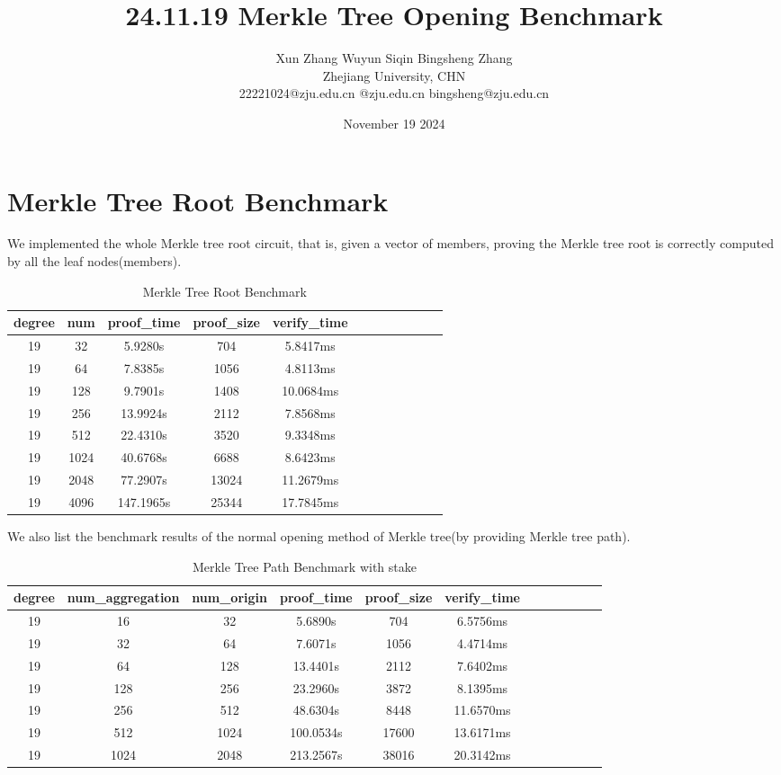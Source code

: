 \documentclass{article}
\title{24.11.19 Merkle Tree Opening Benchmark}
\author{Xun Zhang \quad \quad Wuyun Siqin \quad \quad Bingsheng Zhang \\ 
Zhejiang University, CHN \\
22221024@zju.edu.cn \quad 3210101763@zju.edu.cn \quad bingsheng@zju.edu.cn}
\date{November 19 2024}
\begin{document}
\maketitle

\section{Merkle Tree Root Benchmark}

We implemented the whole Merkle tree root circuit, that is, given a vector of members, proving the Merkle tree root is correctly computed by all the leaf nodes(members).

\begin{table}[h!]
\centering
\begin{tabular}{|c|c|c|c|c|c|c|c|c|c|c|c|}
\hline
\textbf{degree}    & \textbf{num}  & \textbf{proof\_time} & \textbf{proof\_size} & \textbf{verify\_time} \\ \hline
19    & 32 & 5.9280s & 704 & 5.8417ms \\ \hline
19    & 64 & 7.8385s & 1056 & 4.8113ms \\ \hline
19     & 128 & 9.7901s & 1408 & 10.0684ms \\ \hline
19    & 256 & 13.9924s & 2112 & 7.8568ms \\ \hline
19    & 512 & 22.4310s & 3520 & 9.3348ms \\ \hline
19    & 1024 & 40.6768s & 6688 & 8.6423ms \\ \hline
19     & 2048 & 77.2907s & 13024 & 11.2679ms \\ \hline
19     & 4096 & 147.1965s & 25344 & 17.7845ms \\ \hline
\end{tabular}
\caption{Merkle Tree Root Benchmark}
\label{tab:data_table}
\end{table}

We also list the benchmark results of the normal opening method of Merkle tree(by providing Merkle tree path).

\begin{table}[h!]
\centering
\begin{tabular}{|c|c|c|c|c|c|c|c|c|c|c|c|}
\hline
\textbf{degree}    & \textbf{num\_aggregation} & \textbf{num\_origin} & \textbf{proof\_time} & \textbf{proof\_size} & \textbf{verify\_time} \\ \hline
19   & 16 & 32 & 5.6890s & 704 & 6.5756ms \\ \hline
19   & 32 & 64 & 7.6071s & 1056 & 4.4714ms \\ \hline
19    & 64 & 128 & 13.4401s & 2112 & 7.6402ms \\ \hline
19   & 128 & 256 & 23.2960s & 3872 & 8.1395ms \\ \hline
19   & 256 & 512 & 48.6304s & 8448 & 11.6570ms \\ \hline
19    & 512 & 1024 & 100.0534s & 17600 & 13.6171ms \\ \hline
19    & 1024 & 2048 & 213.2567s & 38016 & 20.3142ms \\ \hline
\end{tabular}
\caption{Merkle Tree Path Benchmark with stake}
\label{tab:data_table}
\end{table}
\end{document}

